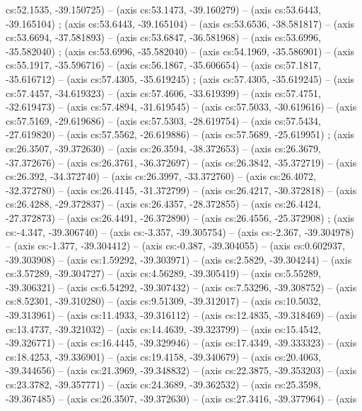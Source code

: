   cs:52.1535, -39.150725) -- (axis cs:53.1473, -39.160279) -- (axis
  cs:53.6443, -39.165104) ;  (axis cs:53.6443,
  -39.165104) -- (axis cs:53.6536, -38.581817) -- (axis cs:53.6694,
  -37.581893) -- (axis cs:53.6847, -36.581968) -- (axis cs:53.6996,
  -35.582040) ;  (axis cs:53.6996, -35.582040) --
  (axis cs:54.1969, -35.586901) -- (axis cs:55.1917, -35.596716) -- (axis
  cs:56.1867, -35.606654) -- (axis cs:57.1817, -35.616712) -- (axis
  cs:57.4305, -35.619245) ;  (axis cs:57.4305,
  -35.619245) -- (axis cs:57.4457, -34.619323) -- (axis cs:57.4606,
  -33.619399) -- (axis cs:57.4751, -32.619473) -- (axis cs:57.4894,
  -31.619545) -- (axis cs:57.5033, -30.619616) -- (axis cs:57.5169,
  -29.619686) -- (axis cs:57.5303, -28.619754) -- (axis cs:57.5434,
  -27.619820) -- (axis cs:57.5562, -26.619886) -- (axis cs:57.5689,
  -25.619951) ;  (axis cs:26.3507, -39.372630) --
  (axis cs:26.3594, -38.372653) -- (axis cs:26.3679, -37.372676) -- (axis
  cs:26.3761, -36.372697) -- (axis cs:26.3842, -35.372719) -- (axis cs:26.392,
  -34.372740) -- (axis cs:26.3997, -33.372760) -- (axis cs:26.4072,
  -32.372780) -- (axis cs:26.4145, -31.372799) -- (axis cs:26.4217,
  -30.372818) -- (axis cs:26.4288, -29.372837) -- (axis cs:26.4357,
  -28.372855) -- (axis cs:26.4424, -27.372873) -- (axis cs:26.4491,
  -26.372890) -- (axis cs:26.4556, -25.372908) ; 
  (axis cs:-4.347, -39.306740) -- (axis cs:-3.357, -39.305754) -- (axis
  cs:-2.367, -39.304978) -- (axis cs:-1.377, -39.304412) -- (axis cs:-0.387,
  -39.304055) -- (axis cs:0.602937, -39.303908) -- (axis cs:1.59292,
  -39.303971) -- (axis cs:2.5829, -39.304244) -- (axis cs:3.57289, -39.304727)
  -- (axis cs:4.56289, -39.305419) -- (axis cs:5.55289, -39.306321) -- (axis
  cs:6.54292, -39.307432) -- (axis cs:7.53296, -39.308752) -- (axis
  cs:8.52301, -39.310280) -- (axis cs:9.51309, -39.312017) -- (axis
  cs:10.5032, -39.313961) -- (axis cs:11.4933, -39.316112) -- (axis
  cs:12.4835, -39.318469) -- (axis cs:13.4737, -39.321032) -- (axis
  cs:14.4639, -39.323799) -- (axis cs:15.4542, -39.326771) -- (axis
  cs:16.4445, -39.329946) -- (axis cs:17.4349, -39.333323) -- (axis
  cs:18.4253, -39.336901) -- (axis cs:19.4158, -39.340679) -- (axis
  cs:20.4063, -39.344656) -- (axis cs:21.3969, -39.348832) -- (axis
  cs:22.3875, -39.353203) -- (axis cs:23.3782, -39.357771) -- (axis
  cs:24.3689, -39.362532) -- (axis cs:25.3598, -39.367485) -- (axis
  cs:26.3507, -39.372630) -- (axis cs:27.3416, -39.377964) -- (axis
